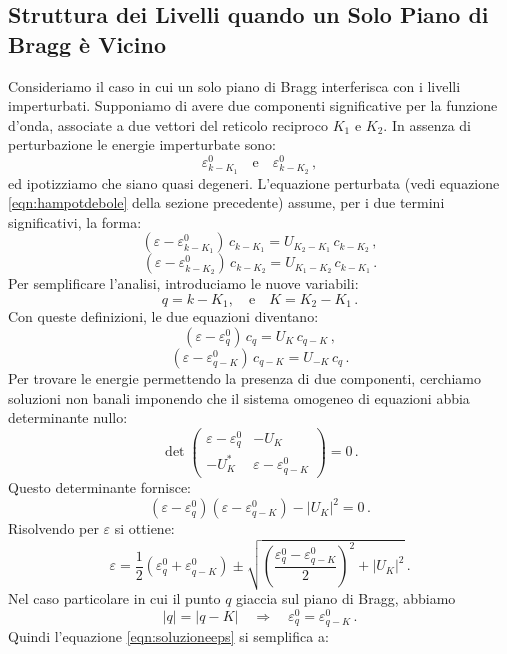 \subsection{Struttura dei Livelli quando un Solo Piano di Bragg è Vicino}
Consideriamo il caso in cui un solo piano di Bragg interferisca con i livelli imperturbati. Supponiamo di avere due componenti significative per la funzione d'onda, associate a due vettori del reticolo reciproco \(K_1\) e \(K_2\). In assenza di perturbazione le energie imperturbate sono:
\[
\varepsilon^0_{k-K_1} \quad \text{e} \quad \varepsilon^0_{k-K_2}\,,
\]
ed ipotizziamo che siano quasi degeneri. L'equazione perturbata (vedi equazione \eqref{eqn:hampotdebole} della sezione precedente) assume, per i due termini significativi, la forma:
\[
(\varepsilon - \varepsilon^0_{k-K_1})\,c_{k-K_1} = U_{K_2 - K_1}\,c_{k-K_2}\,,
\]
\[
(\varepsilon - \varepsilon^0_{k-K_2})\,c_{k-K_2} = U_{K_1 - K_2}\,c_{k-K_1}\,.
\]
Per semplificare l'analisi, introduciamo le nuove variabili:
\[
q = k-K_1,\quad \text{e} \quad K = K_2 - K_1\,.
\]
Con queste definizioni, le due equazioni diventano:
\begin{equation}
(\varepsilon - \varepsilon^0_{q})\, c_{q} = U_{K}\, c_{q-K}\,,
\label{eqn:eqBragg}
\end{equation}
\begin{equation}
(\varepsilon - \varepsilon^0_{q-K})\, c_{q-K} = U_{-K}\, c_{q}\,.
\label{eqn:eqBragg2}
\end{equation}
Per trovare le energie permettendo la presenza di due componenti, cerchiamo soluzioni non banali imponendo che il sistema omogeneo di equazioni abbia determinante nullo:
\[
\det \begin{pmatrix}
\varepsilon - \varepsilon^0_{q} & -U_{K} \\
-U_{K}^* & \varepsilon - \varepsilon^0_{q-K}
\end{pmatrix} = 0\,.
\]
Questo determinante fornisce:
\[
(\varepsilon - \varepsilon^0_{q})(\varepsilon - \varepsilon^0_{q-K}) - |U_K|^2 = 0\,.
\]
Risolvendo per \(\varepsilon\) si ottiene:
\begin{equation}
\varepsilon = \frac{1}{2}\left(\varepsilon^0_{q} + \varepsilon^0_{q-K}\right) \pm \sqrt{\left(\frac{\varepsilon^0_{q} - \varepsilon^0_{q-K}}{2}\right)^2 + |U_K|^2}\,.
\label{eqn:soluzioneeps}
\end{equation}
Nel caso particolare in cui il punto \(q\) giaccia sul piano di Bragg, abbiamo
\[
|q| = |q-K| \quad \Rightarrow \quad \varepsilon^0_{q} = \varepsilon^0_{q-K}\,.
\]
Quindi l'equazione \eqref{eqn:soluzioneeps} si semplifica a:
